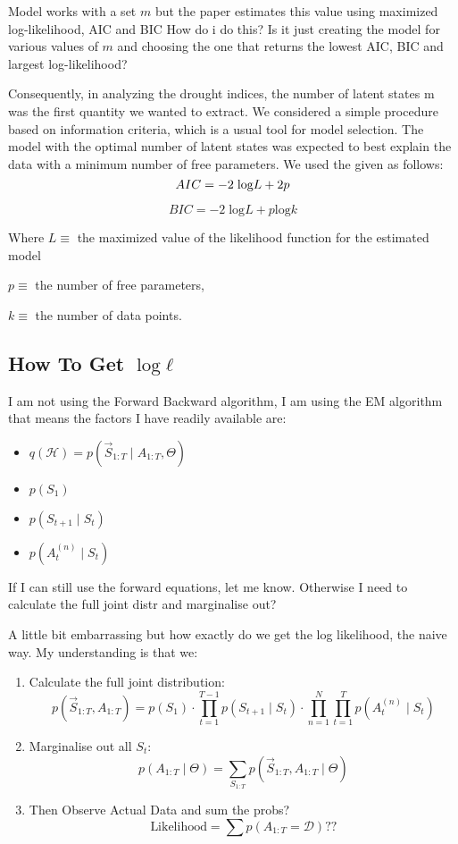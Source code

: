 Model works with a set $m$ but the paper estimates this value using maximized log-likelihood, AIC and BIC
How do i do this? Is it just creating the model for various values of $m$ and choosing the one that returns the lowest AIC, BIC and largest log-likelihood?




 Consequently, in analyzing the drought indices, the number of latent states m was the first quantity we wanted to extract. We considered a simple procedure based on information criteria, which is a usual tool for model selection. The model with the optimal number of latent states was expected to best explain the data with a minimum number of free parameters. We used the  given as follows:
\[
    AIC = -2 \hspace{0.1cm} \text{log} L + 2p
\]

\[
    BIC = -2 \; \text{log}L + p \text{log} k
\]

Where $L \equiv$ the maximized value of the likelihood function for the estimated model

$p \equiv$ the number of free parameters, 

$k \equiv$ the number of data points. 


\subsection{How To Get $\text{log} \; \ell$}

I am not using the Forward Backward algorithm, I am using the EM algorithm that means the factors I have readily available are:

\begin{itemize}
\item $q(\mathcal{H}) = p(\vec{S}_{1:T} \mid A_{1:T}, \Theta)$
\item $p(S_1)$
\item $p(S_{t+1} \mid S_t)$
\item $p(A^{(n)}_t \mid S_t)$
\end{itemize}

If I can still use the forward equations, let me know. Otherwise I need to calculate the full joint distr and marginalise out?


A little bit embarrassing but how exactly do we get the log likelihood, the naive way. My understanding is that we:
\begin{enumerate}
    \item Calculate the full joint distribution: 
    \[
p(\vec{S}_{1:T}, A_{1:T}) = p(S_1) \cdot \prod\limits_{t=1}^{T-1} p(S_{t+1} \mid S_t) \cdot \prod\limits_{n=1}^{N} \prod\limits_{t=1}^T p(A^{(n)}_t \mid S_t)
    \]
    \item Marginalise out all $S_t$: 
        \[
p(A_{1:T} \mid \Theta) = \sum_{S_{1:T}} p(\vec{S}_{1:T}, A_{1:T} \mid \Theta)
        \]
    \item Then Observe Actual Data and sum the probs?
        \[
            \text{Likelihood} = \sum p(A_{1:T} = \mathcal{D}) ??
        \]
\end{enumerate}



